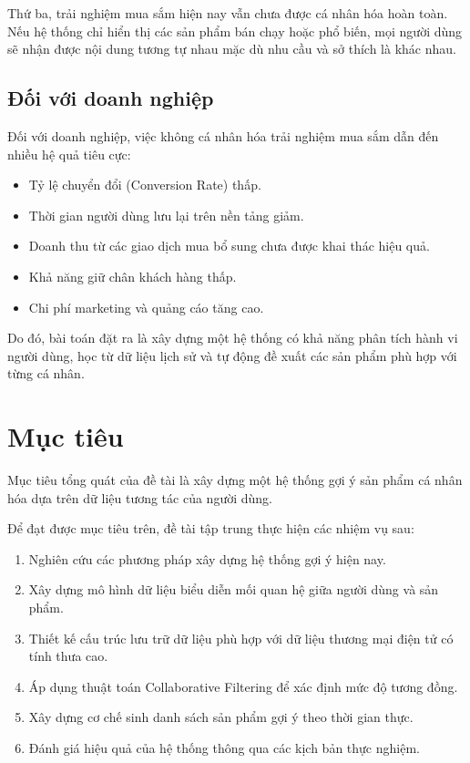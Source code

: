 \documentclass{report}
\begin{document}
Thứ ba, trải nghiệm mua sắm hiện nay vẫn chưa được cá nhân hóa hoàn toàn. Nếu hệ thống chỉ hiển thị các sản phẩm bán chạy hoặc phổ biến, mọi người dùng sẽ nhận được nội dung tương tự nhau mặc dù nhu cầu và sở thích là khác nhau.

\subsection*{Đối với doanh nghiệp}

Đối với doanh nghiệp, việc không cá nhân hóa trải nghiệm mua sắm dẫn đến nhiều hệ quả tiêu cực:

\begin{itemize}
\item Tỷ lệ chuyển đổi (Conversion Rate) thấp.
\item Thời gian người dùng lưu lại trên nền tảng giảm.
\item Doanh thu từ các giao dịch mua bổ sung chưa được khai thác hiệu quả.
\item Khả năng giữ chân khách hàng thấp.
\item Chi phí marketing và quảng cáo tăng cao.
\end{itemize}

Do đó, bài toán đặt ra là xây dựng một hệ thống có khả năng phân tích hành vi người dùng, học từ dữ liệu lịch sử và tự động đề xuất các sản phẩm phù hợp với từng cá nhân.

\section{Mục tiêu}

Mục tiêu tổng quát của đề tài là xây dựng một hệ thống gợi ý sản phẩm cá nhân hóa dựa trên dữ liệu tương tác của người dùng.

Để đạt được mục tiêu trên, đề tài tập trung thực hiện các nhiệm vụ sau:

\begin{enumerate}
\item Nghiên cứu các phương pháp xây dựng hệ thống gợi ý hiện nay.
\item Xây dựng mô hình dữ liệu biểu diễn mối quan hệ giữa người dùng và sản phẩm.
\item Thiết kế cấu trúc lưu trữ dữ liệu phù hợp với dữ liệu thương mại điện tử có tính thưa cao.
\item Áp dụng thuật toán Collaborative Filtering để xác định mức độ tương đồng.
\item Xây dựng cơ chế sinh danh sách sản phẩm gợi ý theo thời gian thực.
\item Đánh giá hiệu quả của hệ thống thông qua các kịch bản thực nghiệm.
\end{enumerate}
\end{document}
